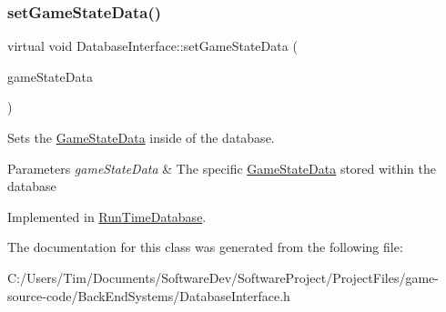 \subsubsection{\texorpdfstring{set\+Game\+State\+Data()}{setGameStateData()}}
{\footnotesize\ttfamily virtual void Database\+Interface\+::set\+Game\+State\+Data (\begin{DoxyParamCaption}\item[{\hyperlink{struct_game_state_data}{Game\+State\+Data}}]{game\+State\+Data }\end{DoxyParamCaption})\hspace{0.3cm}{\ttfamily [pure virtual]}}



Sets the \hyperlink{struct_game_state_data}{Game\+State\+Data} inside of the database. 


\begin{DoxyParams}{Parameters}
{\em game\+State\+Data} & The specific \hyperlink{struct_game_state_data}{Game\+State\+Data} stored within the database \\
\hline
\end{DoxyParams}


Implemented in \hyperlink{class_run_time_database_af18f09a5166adc6ab075034e272e9c8d}{Run\+Time\+Database}.



The documentation for this class was generated from the following file\+:\begin{DoxyCompactItemize}
\item 
C\+:/\+Users/\+Tim/\+Documents/\+Software\+Dev/\+Software\+Project/\+Project\+Files/game-\/source-\/code/\+Back\+End\+Systems/Database\+Interface.\+h\end{DoxyCompactItemize}
